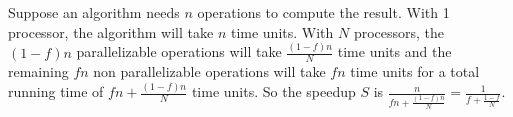\documentclass[12pt]{article}
\begin{document}
Suppose an algorithm needs $n$ operations to compute the result. With 1 processor, the algorithm will take $n$ time units. With $N$ processors, the $(1-f)n$ parallelizable operations will take $\frac{(1-f)n}{N}$ time units and the remaining $fn$ non parallelizable operations will take $fn$ time units for a total running time of $fn+\frac{(1-f)n}{N}$ time units. So the speedup $S$ is $\frac{n}{fn+\frac{(1-f)n}{N}}=\frac{1}{f+\frac{1-f}{N}}$.
\end{document}
